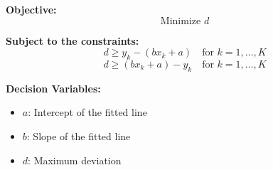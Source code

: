 \documentclass{article}
\begin{document}
\textbf{Objective:}
\[
\text{Minimize } d
\]

\textbf{Subject to the constraints:}
\[
d \geq y_k - (bx_k + a) \quad \text{for } k = 1, \ldots, K
\]
\[
d \geq (bx_k + a) - y_k \quad \text{for } k = 1, \ldots, K
\]

\textbf{Decision Variables:}
\begin{itemize}
    \item \( a \): Intercept of the fitted line
    \item \( b \): Slope of the fitted line
    \item \( d \): Maximum deviation
\end{itemize}
\end{document}
